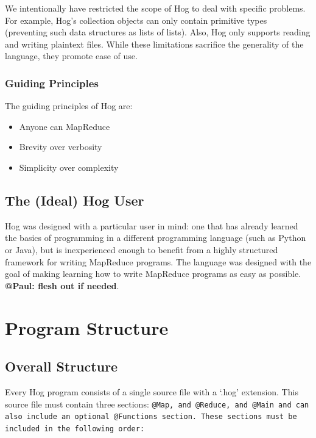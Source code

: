 \documentclass{article}
\begin{document}
We intentionally have restricted the scope of Hog to deal with specific problems. For example, Hog's collection objects can
only contain primitive types (preventing such data structures as lists of lists). Also, Hog only supports reading and writing
plaintext files. While these limitations sacrifice the generality of the language, they promote ease of use.

\subsubsection{Guiding Principles} %
\label{ssub:guiding_principles}

The guiding principles of Hog are:

\begin{itemize}
  \item Anyone can MapReduce
  \item Brevity over verbosity
  \item Simplicity over complexity
\end{itemize}



\subsection{The (Ideal) Hog User} %
\label{sub:the_ideal_hog_user}

Hog was designed with a particular user in mind: one that has already learned the basics of programming in a different
programming language (such as Python or Java), but is inexperienced enough to benefit from a highly structured framework for
writing MapReduce programs. The language was designed with the goal of making learning how to write MapReduce programs as easy
as possible. \textbf{@Paul: flesh out if needed}.


\section{Program Structure} %
\label{sec:program_structure}

\subsection{Overall Structure} %
\label{sub:overall_structure}

Every Hog program consists of a single source file with a ‘.hog’ extension. This
source file must contain three sections: \tt @Map\rm, and \tt @Reduce\rm, and
\tt @Main \rm and can also include an optional \tt @Functions \rm section. These
sections must be included in the following order:
\end{document}
